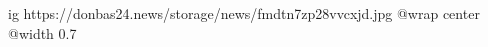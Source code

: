  
 
 
 
 

\ifcmt
  ig https://donbas24.news/storage/news/fmdtn7zp28vvcxjd.jpg
  @wrap center
  @width 0.7
\fi
